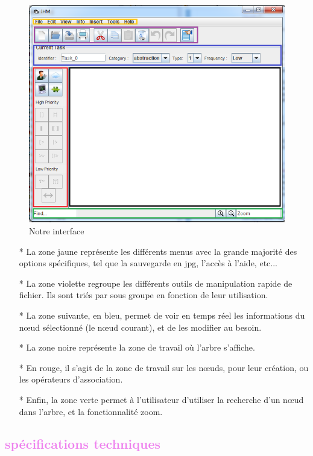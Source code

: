 \documentclass[12pt, a4paper]{article}
\begin{document}
\begin{figure}[!h]
\begin{center}
   \includegraphics[scale = 0.9]{interface.png}
	\caption{Notre interface}
	\end{center}
\end{figure}
\newpage
\begin{itemize}
\item [*]La zone jaune représente les différents menus avec la grande majorité des options spécifiques, tel que la sauvegarde en jpg, l'accès à l'aide, etc... 
\item [*]La zone violette regroupe les différents outils de manipulation rapide de fichier. Ils sont triés par sous groupe en fonction de leur utilisation. 
\item [*]La zone suivante, en bleu, permet de voir en temps réel les informations du nœud sélectionné (le nœud courant), et de les modifier au besoin. 
\item [*]La zone noire représente la zone de travail où l'arbre s'affiche. 
\item [*]En rouge, il s'agit de la zone de travail sur les nœuds, pour leur création, ou les opérateurs d'association. 
\item [*]Enfin, la zone verte permet à l'utilisateur d'utiliser la recherche d'un nœud dans l'arbre, et la fonctionnalité zoom.
\end{itemize}

\newpage
\textcolor{Violet}{\section{spécifications techniques}}
\end{document}
